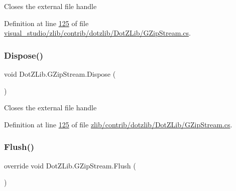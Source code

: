 Closes the external file handle 



Definition at line \hyperlink{visual__studio_2zlib_2contrib_2dotzlib_2_dot_z_lib_2_g_zip_stream_8cs_source_l00125}{125} of file \hyperlink{visual__studio_2zlib_2contrib_2dotzlib_2_dot_z_lib_2_g_zip_stream_8cs_source}{visual\+\_\+studio/zlib/contrib/dotzlib/\+Dot\+Z\+Lib/\+G\+Zip\+Stream.\+cs}.

\mbox{\label{class_dot_z_lib_1_1_g_zip_stream_a1fab7340250fa883c12ab08502826d07}} 
\subsubsection{\texorpdfstring{Dispose()}{Dispose()}\hspace{0.1cm}{\footnotesize\ttfamily [2/2]}}
{\footnotesize\ttfamily void Dot\+Z\+Lib.\+G\+Zip\+Stream.\+Dispose (\begin{DoxyParamCaption}{ }\end{DoxyParamCaption})\hspace{0.3cm}{\ttfamily [inline]}}



Closes the external file handle 



Definition at line \hyperlink{zlib_2contrib_2dotzlib_2_dot_z_lib_2_g_zip_stream_8cs_source_l00125}{125} of file \hyperlink{zlib_2contrib_2dotzlib_2_dot_z_lib_2_g_zip_stream_8cs_source}{zlib/contrib/dotzlib/\+Dot\+Z\+Lib/\+G\+Zip\+Stream.\+cs}.

\mbox{\label{class_dot_z_lib_1_1_g_zip_stream_a1e219fd4cc6c0f3c3bbd373f9724e24e}} 
\subsubsection{\texorpdfstring{Flush()}{Flush()}\hspace{0.1cm}{\footnotesize\ttfamily [1/2]}}
{\footnotesize\ttfamily override void Dot\+Z\+Lib.\+G\+Zip\+Stream.\+Flush (\begin{DoxyParamCaption}{ }\end{DoxyParamCaption})\hspace{0.3cm}{\ttfamily [inline]}}



